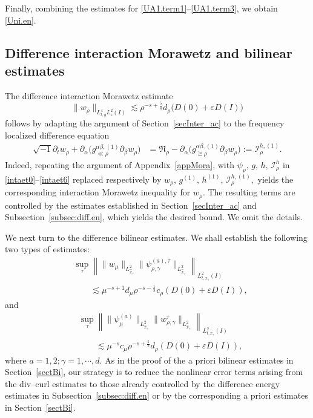 \documentclass[11pt,letterpaper,reqno]{amsart}
\numberwithin{equation}{section}
\theoremstyle{definition}
\theoremstyle{remark}
\begin{document}
 Finally, combining the estimates for
\eqref{UA1.term1}--\eqref{UA1.term3}, we obtain \eqref{Uni.en}.



\subsection{Difference interaction Morawetz and bilinear estimates}
The difference interaction Morawetz estimate
\[
\|w_\rho\|_{L_{t,y}^4L_z^2(I)}
\lesssim
\rho^{-s+\frac54}d_\rho
\bigl(D(0)+\varepsilon D(I)\bigr)
\]
follows by adapting the argument of Section~\ref{secInter_ac} to the
frequency localized difference equation
\begin{align*}
\sqrt{-1}\partial_t w_\rho
+\partial_\alpha
\bigl(g_{\ll\rho}^{\alpha\beta,(1)}
\partial_\beta w_\rho\bigr)
&=
\mathfrak{N}_\rho
-\partial_\alpha
\bigl(g_{\gtrsim\rho}^{\alpha\beta,(1)}
\partial_\beta w_\rho\bigr)
:=\mathcal{I}_\rho^{h,(1)}.
\end{align*}
Indeed, repeating the argument of Appendix~\ref{appMora},  with
\(
\psi_\rho,\, g,\, h,\, \mathcal{I}_\rho^h
\)
in \eqref{intaet0}--\eqref{intaet6} replaced respectively by
\(
w_\rho, \,g^{(1)}, \, h^{(1)},\,
\mathcal{I}_\rho^{h,(1)},
\) yields the corresponding interaction Morawetz inequality for \(w_\rho\). The resulting terms are controlled by the estimates
established in Section~\ref{secInter_ac} and
Subsection~\ref{subsec:diff.en}, which yields the desired bound. We omit
the details.
 
 
 We next turn to the difference bilinear estimates. We shall establish the following two types of estimates:
\begin{align}
&\sup_\tau
\left\|
\|w_\mu \|_{L_{\widehat x_\gamma}^2}
\| \psi^{(a),\tau}_{\rho,\gamma}\|_{L_{\widehat x_\gamma}^2}
\right\|_{L_{t,x_\gamma}^2(I)}
\nonumber\\
&\qquad\lesssim
\mu^{-s+1}d_\mu
\rho^{-s-\frac12}c_\rho
\left(
D(0)+\varepsilon D(I)
\right),
\label{weak-bilinear-one}
\end{align}
and
\begin{align}
&\sup_\tau
\left\|
\|\psi_\mu^{(a)}\|_{L_{\widehat x_\gamma}^2}
\|  w^\tau_{\rho,\gamma}\|_{L_{\widehat x_\gamma}^2}
\right\|_{L_{t,x_\gamma}^2(I)}
\nonumber\\
&\qquad\lesssim
\mu^{-s}c_\mu
\rho^{-s+\frac12}d_\rho
\left(
D(0)+\varepsilon D(I)
\right),
\label{weak-bilinear-two}
\end{align}
 where \( a=1,2; \gamma=1,\cdots,d.\)  As in the proof of the a priori bilinear estimates in
Section~\ref{sectBi}, our strategy is to reduce the nonlinear error terms
arising from the div--curl estimates to those already controlled by
the difference energy estimates in Subsection~\ref{subsec:diff.en} or by
the corresponding a priori estimates in Section~\ref{sectBi}.
\end{document}
